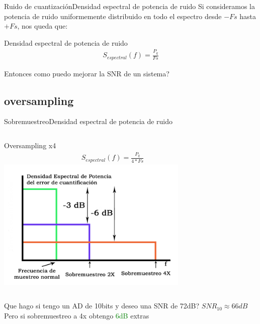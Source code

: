  \begin{frame}{Ruido de cuantización}{Densidad espectral de potencia de ruido}
    Si consideramos la potencia de ruido uniformemente distribuido en todo el espectro desde $-Fs$ hasta $+Fs$, nos queda que:
    \begin{block}{Densidad espectral de potencia de ruido}
       \begin{align*}
          S_{espectral}(f) = \frac{P_q}{Fs}
       \end{align*}
    \end{block}
    Entonces como puedo mejorar la SNR de un sistema?
    \vfill
 \end{frame}
 \subsection{oversampling}
 \begin{frame}{Sobremuestreo}{Densidad espectral de potencia de ruido}
    \begin{columns}[onlytextwidth]
       Oversampling x4
       \begin{align*}
          S_{espectral}(f) = \frac{P_q}{4*Fs}
       \end{align*}
       \center\includegraphics[width=0.8\textwidth]{1_clase/oversampling}
    \end{columns}
    \vfill
    Que hago si tengo un AD de 10bits y deseo una SNR de 72dB?
    $SNR_{10}\approx 66dB$
    Pero si sobremuestreo a 4x obtengo \textcolor{green}{6dB} extras
 \end{frame}
